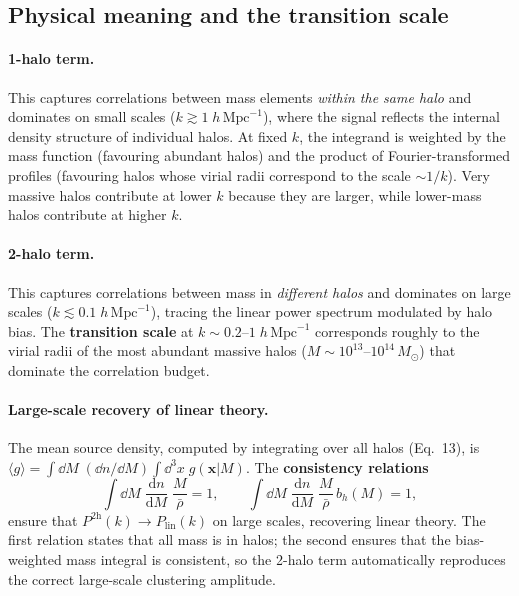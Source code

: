 \documentclass[10pt,a4paper]{article}
\newcommand{\vect}[1]{\mathbf{#1}}
\newcommand{\ddn}{\frac{\mathrm{d}n}{\mathrm{d}M}}
\newcommand{\rhobar}{\bar{\rho}}
\newcommand{\Plin}{P_{\mathrm{lin}}}
\newcommand{\Msun}{M_\odot}
\begin{document}
\subsection{Physical meaning and the transition scale}

\paragraph{1-halo term.} This captures correlations between mass elements \textit{within the same halo} and dominates on small scales ($k \gtrsim 1 \; h \, \mathrm{Mpc}^{-1}$), where the signal reflects the internal density structure of individual halos. At fixed $k$, the integrand is weighted by the mass function (favouring abundant halos) and the product of Fourier-transformed profiles (favouring halos whose virial radii correspond to the scale $\sim 1/k$). Very massive halos contribute at lower $k$ because they are larger, while lower-mass halos contribute at higher $k$.

\paragraph{2-halo term.} This captures correlations between mass in \textit{different halos} and dominates on large scales ($k \lesssim 0.1 \; h \, \mathrm{Mpc}^{-1}$), tracing the linear power spectrum modulated by halo bias. The \textbf{transition scale} at $k \sim 0.2$--$1 \; h \, \mathrm{Mpc}^{-1}$ corresponds roughly to the virial radii of the most abundant massive halos ($M \sim 10^{13}$--$10^{14} \, \Msun$) that dominate the correlation budget.

\paragraph{Large-scale recovery of linear theory.} The mean source density, computed by integrating over all halos (Eq.~13), is $\langle g \rangle = \int \dd M \; (\dd n/\dd M) \int \dd^3 x \; g(\vect{x} | M)$. The \textbf{consistency relations}
\begin{equation}
\int \dd M \; \ddn \; \frac{M}{\rhobar} = 1, \qquad \int \dd M \; \ddn \; \frac{M}{\rhobar} \, b_h(M) = 1,
\end{equation}
ensure that $P^{\mathrm{2h}}(k) \to \Plin(k)$ on large scales, recovering linear theory. The first relation states that all mass is in halos; the second ensures that the bias-weighted mass integral is consistent, so the 2-halo term automatically reproduces the correct large-scale clustering amplitude.
\end{document}

